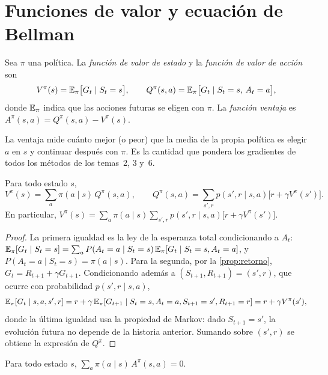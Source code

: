 \section{Funciones de valor y ecuación de Bellman}

\begin{definicion}\label{def:valor}
Sea $\pi$ una política. La \emph{función de valor de estado} y la \emph{función de valor de acción} son
\[
V^{\pi}(s)=\mathbb{E}_{\pi}\bigl[G_t\mid S_t=s\bigr],\qquad Q^{\pi}(s,a)=\mathbb{E}_{\pi}\bigl[G_t\mid S_t=s,\,A_t=a\bigr],
\]
donde $\mathbb{E}_\pi$ indica que las acciones futuras se eligen con $\pi$. La \emph{función ventaja} es $A^{\pi}(s,a)=Q^{\pi}(s,a)-V^{\pi}(s)$.
\end{definicion}

La ventaja mide cuánto mejor (o peor) que la media de la propia política es elegir $a$ en $s$ y continuar después con $\pi$. Es la cantidad que pondera los gradientes de todos los métodos de los temas~2, 3 y~6.

\begin{teorema}\label{teo:bellman}
Para todo estado $s$,
\[
V^{\pi}(s)=\sum_{a}\pi(a\mid s)\,Q^{\pi}(s,a),\qquad Q^{\pi}(s,a)=\sum_{s',r}p(s',r\mid s,a)\bigl[r+\gamma V^{\pi}(s')\bigr].
\]
En particular, $V^{\pi}(s)=\sum_{a}\pi(a\mid s)\sum_{s',r}p(s',r\mid s,a)\bigl[r+\gamma V^{\pi}(s')\bigr]$.
\end{teorema}

\begin{proof}
La primera igualdad es la ley de la esperanza total condicionando a $A_t$: $\mathbb{E}_\pi[G_t\mid S_t=s]=\sum_a P(A_t=a\mid S_t=s)\,\mathbb{E}_\pi[G_t\mid S_t=s,A_t=a]$, y $P(A_t=a\mid S_t=s)=\pi(a\mid s)$. Para la segunda, por la \cref{prop:retorno}, $G_t=R_{t+1}+\gamma G_{t+1}$. Condicionando además a $(S_{t+1},R_{t+1})=(s',r)$, que ocurre con probabilidad $p(s',r\mid s,a)$,
\[
\mathbb{E}_\pi[G_t\mid s,a,s',r]=r+\gamma\,\mathbb{E}_\pi[G_{t+1}\mid S_t=s,A_t=a,S_{t+1}=s',R_{t+1}=r]=r+\gamma V^{\pi}(s'),
\]
donde la última igualdad usa la propiedad de Markov: dado $S_{t+1}=s'$, la evolución futura no depende de la historia anterior. Sumando sobre $(s',r)$ se obtiene la expresión de $Q^{\pi}$.
\end{proof}

\begin{corolario}\label{cor:ventaja-media}
Para todo estado $s$, $\displaystyle\sum_{a}\pi(a\mid s)\,A^{\pi}(s,a)=0$.
\end{corolario}

